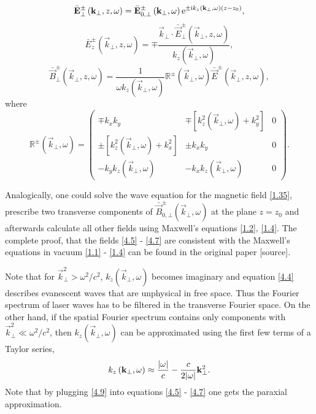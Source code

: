 \begin{equation}
\label{4.5}
\bar{\mathbf{E}}^{\pm}_{\bot} \left(\mathbf{k}_\bot, z, \omega \right) = \bar{\mathbf{E}}^{\pm}_{0, \bot} \left(\mathbf{k}_\bot, \omega \right) \mathrm{e}^{\pm \mathrm{i} k_z \left(\mathbf{k}_\bot, \omega \right) \left(z - z_0 \right)},
\end{equation}
\begin{equation}
\label{4.6}
\bar{E}^{\pm}_z \left(\vec{k}_\bot, z, \omega \right) = \mp \frac{\vec{k}_\bot \cdot \bar{\vec{E}}^{\pm}_{\bot}(\vec{k}_\bot, z, \omega)}{k_z \left(\vec{k}_\bot, \omega \right)},
\end{equation}
\begin{equation}
\label{4.7}
\bar{\vec{B}}^{\pm}_{\bot} \left(\vec{k}_\bot, z, \omega \right) = \frac{1}{\omega k_z \left(\vec{k}_\bot, \omega \right)} \mathbb{R}^{\pm} \left(\vec{k}_\bot, \omega \right) \bar{\vec{E}}^{\pm} \left(\vec{k}_\bot, z, \omega \right),
\end{equation}
where
\begingroup
\renewcommand*{\arraystretch}{1.7}
\begin{equation}
\label{4.8}
\mathbb{R}^{\pm} \left(\vec{k}_\bot, \omega \right) =  \begin{pmatrix}
\mp k_x k_y & \mp \left[ k_z^2 \left(\vec{k}_\bot, \omega \right) + k_y^2 \right] & 0 \\
\pm \left[ k_z^2 \left(\vec{k}_\bot, \omega \right) + k_x^2 \right] & \pm k_x k_y & 0 \\
- k_y k_z \left(\vec{k}_\bot, \omega \right) & - k_x k_z \left(\vec{k}_\bot, \omega \right) & 0
\end{pmatrix}.
\end{equation} 
\endgroup

Analogically, one could solve the wave equation for the magnetic field \ref{1.35}, prescribe two transverse components of $ \bar{\vec{B}}_{0, \bot}^{\pm}\left(\vec{k}_\bot, \omega \right) $ at the plane $ z = z_0 $ and afterwards calculate all other fields using Maxwell's equations \ref{1.2}, \ref{1.4}. The complete proof, that the fields \ref{4.5} - \ref{4.7} are consistent with the Maxwell's equations in vacuum \ref{1.1} - \ref{1.4} can be found in the original paper [source].

Note that for $ \vec{k}_\bot^2 > \omega^2/c^2 $, $ k_z \left(\vec{k}_\bot, \omega \right) $ becomes imaginary and equation \ref{4.4} describes evanescent waves that are unphysical in free space. Thus the Fourier spectrum of laser waves has to be filtered in the transverse Fourier space. On the other hand, if the spatial Fourier spectrum contains only components with $ \vec{k}_\bot^2 \ll \omega^2/c^2 $, then $ k_z \left(\vec{k}_\bot, \omega \right) $ can be approximated using the first few terms of a Taylor series,
\begin{equation}
\label{4.9}
k_z \left(\mathbf{k}_\bot, \omega \right) \approx \frac{\lvert\omega\rvert}{c} - \frac{c}{2 \lvert\omega\rvert} \mathbf{k}_\bot^2.
\end{equation}
Note that by plugging \ref{4.9} into equations \ref{4.5} - \ref{4.7} one gets the paraxial approximation.

